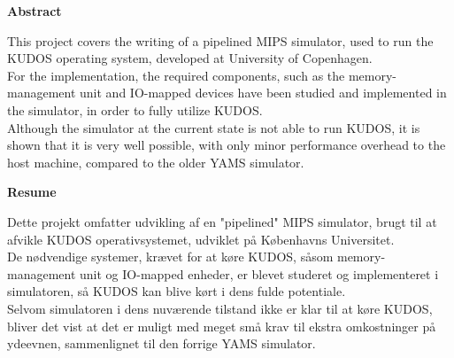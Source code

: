 \begin{center}
\textbf{Abstract}\\
\end{center}
This project covers the writing of a pipelined MIPS simulator, used to run the
KUDOS operating system, developed at University of Copenhagen.\\
For the implementation, the required components, such as the memory-management
unit and IO-mapped devices have been studied and implemented in the simulator,
in order to fully utilize KUDOS.\\
Although the simulator at the current state is not able to run KUDOS, it is shown
that it is very well possible, with only minor performance overhead to the host
machine, compared to the older YAMS simulator.




\begin{center}
\textbf{Resume}\\
\end{center}
Dette projekt omfatter udvikling af en "pipelined" MIPS simulator, brugt til at
afvikle KUDOS operativsystemet, udviklet på Københavns Universitet.\\
De nødvendige systemer, krævet for at køre KUDOS, såsom memory-management unit og IO-mapped
enheder, er blevet studeret og implementeret i simulatoren, så KUDOS kan blive kørt
i dens fulde potentiale.\\
Selvom simulatoren i dens nuværende tilstand ikke er klar til at køre KUDOS, bliver
det vist at det er muligt med meget små krav til ekstra omkostninger på
ydeevnen, sammenlignet til den forrige YAMS simulator.

